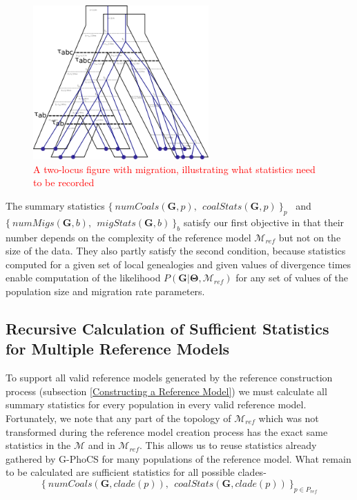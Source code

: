\documentclass[11pt]{article}
\newcommand{\vect}[1]{\boldsymbol{\mathbf{#1}}}
\newcommand{\M}{\mathcal{M}}
\newcommand{\G}{\vect{G}}
\newcommand{\T}{\vect{\Theta}}
\newcommand{\Mref}{\M_{ref}}
\newcommand{\1}{\mathbbm{1}}
\newcommand{\gp}{G-PhoCS }
\begin{document}
\begin{figure}[h]
\centering
\includegraphics[width=0.6\textwidth]
{two_locus}
\caption{\textcolor{red}{A two-locus figure with migration, illustrating what statistics need to be recorded}}
\label{fig:multiple_loci}
\end{figure}


The summary statistics $\{~numCoals(\G,p),~~ coalStats(\G,p)~\}_p$~ and ~$\{~numMigs(\G,b),~~ migStats(\G,b)~\}_b$ satisfy our first objective in that their number depends on the complexity of the reference model $\Mref$ but not on the size of the data.
%
They also partly satisfy the second condition, because statistics computed for a given set of local genealogies and given values of divergence times enable computation of the likelihood $P(\G|\T,\Mref)$ for any set of values of the population size and migration rate parameters.
%



\subsection{Recursive Calculation of Sufficient Statistics for Multiple Reference Models}
To support all valid reference models generated by the reference construction process (subsection \ref{Constructing a Reference Model}) we must calculate all summary statistics for every population in every valid reference model.
%
Fortunately, we note that any part of the topology of $\Mref$ which was not transformed during the reference model creation process has the exact same statistics in the $\M$ and in $\Mref$. This allows us to reuse statistics already gathered by \gp for many populations of the reference model. What remain to be calculated are sufficient statistics for all possible clades-  \[\{~numCoals(\G,clade(p)),~~ coalStats(\G,clade(p))~\}_{p\in P_{ref}}\]
\end{document}
